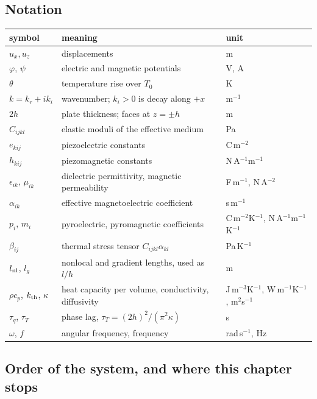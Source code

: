 \documentclass[11pt]{article}
\begin{document}
\subsection{Notation}

\begin{center}
\small
\begin{tabular}{p{2.4cm}p{6.7cm}p{3.4cm}}
\toprule
symbol & meaning & unit\\
\midrule
$u_x,u_z$ & displacements & m\\
$\varphi$, $\psi$ & electric and magnetic potentials & V, A\\
$\theta$ & temperature rise over $T_0$ & K\\
$k=k_r+ik_i$ & wavenumber; $k_i>0$ is decay along $+x$ & m$^{-1}$\\
$2h$ & plate thickness; faces at $z=\pm h$ & m\\
$C_{ijkl}$ & elastic moduli of the effective medium & Pa\\
$e_{kij}$ & piezoelectric constants & C\,m$^{-2}$\\
$h_{kij}$ & piezomagnetic constants & N\,A$^{-1}$m$^{-1}$\\
$\epsilon_{ik}$, $\mu_{ik}$ & dielectric permittivity, magnetic permeability & F\,m$^{-1}$, N\,A$^{-2}$\\
$\alpha_{ik}$ & effective magnetoelectric coefficient & s\,m$^{-1}$\\
$p_i$, $m_i$ & pyroelectric, pyromagnetic coefficients & C\,m$^{-2}$K$^{-1}$, N\,A$^{-1}$m$^{-1}$K$^{-1}$\\
$\beta_{ij}$ & thermal stress tensor $C_{ijkl}\alpha_{kl}$ & Pa\,K$^{-1}$\\
$l_{\rm nl}$, $l_g$ & nonlocal and gradient lengths, used as $l/h$ & m\\
$\rho c_p$, $k_{\rm th}$, $\kappa$ & heat capacity per volume, conductivity, diffusivity & J\,m$^{-3}$K$^{-1}$, W\,m$^{-1}$K$^{-1}$, m$^2$s$^{-1}$\\
$\tau_q$, $\tau_T$ & phase lag, $\tau_T=(2h)^2/(\pi^2\kappa)$ & s\\
$\omega$, $f$ & angular frequency, frequency & rad\,s$^{-1}$, Hz\\
\bottomrule
\end{tabular}
\end{center}

\subsection{Order of the system, and where this chapter stops}
\end{document}
